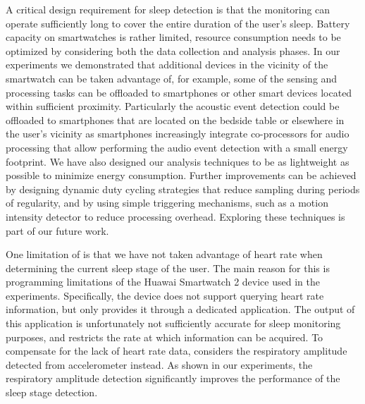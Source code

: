  A critical design requirement for sleep detection is that the monitoring can operate sufficiently long to
      cover the entire duration of the user's sleep. Battery capacity on smartwatches is rather limited, resource consumption needs to be
      optimized by considering both the data collection and analysis phases. In our experiments we demonstrated that additional devices
      in the vicinity of the smartwatch can be taken advantage of, for example, some of the sensing and processing tasks can be offloaded
      to smartphones or other smart devices located within sufficient proximity. Particularly the acoustic event detection could be
      offloaded to smartphones that are located on the bedside table or elsewhere in the user's vicinity as smartphones increasingly
      integrate co-processors for audio processing that allow performing the audio event detection with a small energy footprint. We have
      also designed our analysis techniques to be as lightweight as possible to minimize energy consumption. Further improvements can be
      achieved by designing dynamic duty cycling strategies that reduce sampling during periods of regularity, and by using simple
      triggering mechanisms, such as a motion intensity detector to reduce processing overhead. Exploring these techniques is part of our
      future work.


 One limitation of {\systemname} is that we have not taken advantage of heart rate when determining the
      current sleep stage of the user. The main reason for this is programming limitations of the Huawai Smartwatch 2 device used in the
      experiments. Specifically, the device does not support querying heart rate information, but only provides it through a dedicated
      application. The output of this application is unfortunately not sufficiently accurate for sleep monitoring purposes, and restricts
      the rate at which information can be acquired. To compensate for the lack of heart rate data, \systemname considers the respiratory
      amplitude detected from accelerometer instead. As shown in our experiments, the respiratory amplitude detection significantly
      improves the performance of the sleep stage detection.


